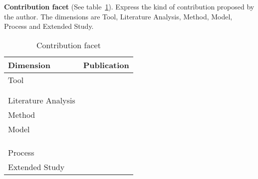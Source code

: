 \textbf{Contribution facet} (See table~\ref{table:contribution}).
Express the kind of contribution proposed by the author. 
The dimensions are Tool, Literature Analysis, Method, Model, Process and Extended Study.
\begin{table}[h]
\begin{center}
\begin{tabular}{p{4cm}p{10cm}}
\hline 
\textbf{Dimension} & \textbf{Publication} \\ 
\hline 
Tool & \cite{001,002,005,011,014,015,016,019,024,026,028,029,032,035,046,053,054} \\
     & \cite{056,061,064,065,066,068,070,071,074,077,078} \\ 
     & \cite{081,086,087,088,091,093,094,095,110,112,113} \\ 
\hline 
Literature Analysis & \cite{003,004,010,038,042,048,052,069,073,089,099,103,105,108,109,111} \\ 
\hline 
Method & \cite{011,043,051,075,076,092,101,102,106,107} \\ 
\hline 
Model & \cite{006,007,008,009,012,013,017,018,020,027,030,031,033,034,036,037} \\
      & \cite{039,040,041,044,045,049,050,055,056,057,058,059,060} \\
      & \cite{062,063,066,067,070,071,072,079,080,082,083,084,085,087,088} \\ 
      & \cite{090,096,098,114} \\  
\hline 
Process & \cite{021,022,023,025,096,100} \\ 
\hline 
Extended Study & \cite{047,097,104} \\ 
\hline 
\end{tabular}
\end{center}
\caption{Contribution facet}\label{table:contribution}
\end{table}
